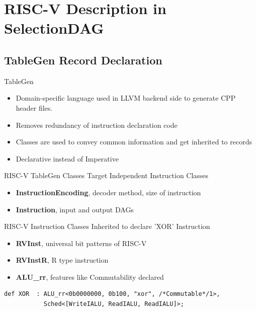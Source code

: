 \section{RISC-V Description in SelectionDAG}
\subsection{TableGen Record Declaration}
\begin{frame}{TableGen}
    \begin{itemize}
        \item Domain-specific language used in LLVM backend side to generate CPP header files.
        \item
        Removes redundancy of instruction declaration code
        \item
        Classes are used to convey common information and get inherited to records
        \item
        Declarative instead of Imperative
    \end{itemize}
\end{frame}

\begin{frame}[fragile]{RISC-V TableGen Classes}
Target Independent Instruction Classes
    \begin{itemize}
        \item \textbf{InstructionEncoding}, decoder method, size of instruction
        \item
        \textbf{Instruction}, input and output DAGs
    \end{itemize}
RISC-V Instruction Classes Inherited to declare 'XOR' Instruction
    \begin{itemize}
        \item \textbf{RVInst}, universal bit patterns of RISC-V
        \item
        \textbf{RVInstR}, R type instruction
        \item
        \textbf{ALU\_rr}, features like Commutability declared
    \end{itemize}
\begin{lstlisting}
def XOR  : ALU_rr<0b0000000, 0b100, "xor", /*Commutable*/1>,
           Sched<[WriteIALU, ReadIALU, ReadIALU]>;
\end{lstlisting}
\end{frame}


